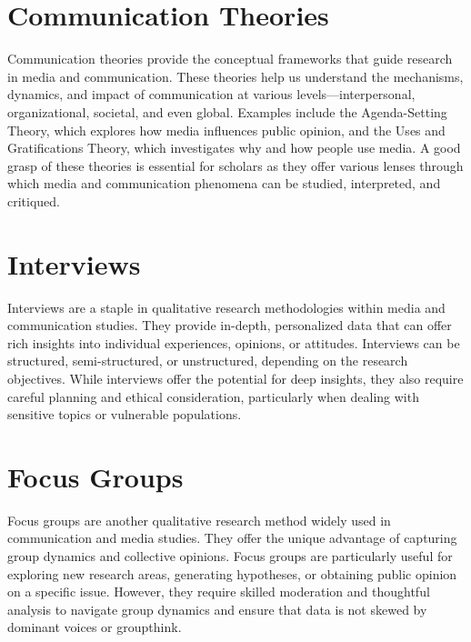 \documentclass[
  b5paper]{book}
\begin{document}
\hypertarget{communication-theories}{%
\section*{Communication Theories}\label{communication-theories}}

Communication theories provide the conceptual frameworks that guide research in media and communication. These theories help us understand the mechanisms, dynamics, and impact of communication at various levels---interpersonal, organizational, societal, and even global. Examples include the Agenda-Setting Theory, which explores how media influences public opinion, and the Uses and Gratifications Theory, which investigates why and how people use media. A good grasp of these theories is essential for scholars as they offer various lenses through which media and communication phenomena can be studied, interpreted, and critiqued.

\hypertarget{interviews}{%
\section*{Interviews}\label{interviews}}

Interviews are a staple in qualitative research methodologies within media and communication studies. They provide in-depth, personalized data that can offer rich insights into individual experiences, opinions, or attitudes. Interviews can be structured, semi-structured, or unstructured, depending on the research objectives. While interviews offer the potential for deep insights, they also require careful planning and ethical consideration, particularly when dealing with sensitive topics or vulnerable populations.

\hypertarget{focus-groups}{%
\section*{Focus Groups}\label{focus-groups}}

Focus groups are another qualitative research method widely used in communication and media studies. They offer the unique advantage of capturing group dynamics and collective opinions. Focus groups are particularly useful for exploring new research areas, generating hypotheses, or obtaining public opinion on a specific issue. However, they require skilled moderation and thoughtful analysis to navigate group dynamics and ensure that data is not skewed by dominant voices or groupthink.
\end{document}
